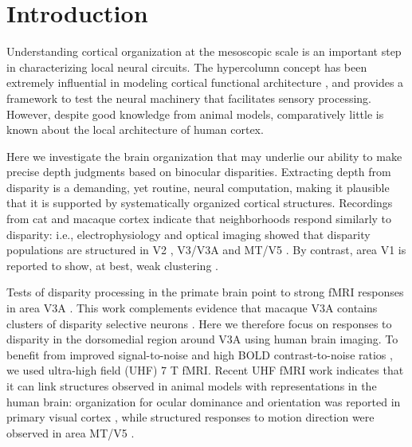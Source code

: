 \section{Introduction}

Understanding cortical organization at the mesoscopic scale is an important step in characterizing local neural circuits. The hypercolumn concept \cite{Hubel:1974sv} has been extremely influential in modeling cortical functional architecture \cite{Tso:2009tg}, and provides a framework to test the neural machinery that facilitates sensory processing. However, despite good knowledge from animal models, comparatively little is known about the local architecture of human cortex. 

Here we investigate the brain organization that may underlie our ability to make precise depth judgments based on binocular disparities. Extracting depth from disparity is a demanding, yet routine, neural computation, making it plausible that it is supported by systematically organized cortical structures. Recordings from cat and macaque cortex indicate that neighborhoods respond similarly to disparity: i.e., electrophysiology and optical imaging showed that disparity populations are structured in V2 \cite{Hubel:1987ly,Roe:1995ys,Tso:2001zr,Chen:2008vn,Kara:2009fk}, V3/V3A \cite{Adams:2001wt,Anzai:2011gb,Yeagle_Lafer-Sousa_Conway_2013} and MT/V5 \cite{DeAngelis:1999fk}. By contrast, area V1 is reported to show, at best, weak clustering \cite{LeVay:1988ve,Prince:2002cr}.

Tests of disparity processing in the primate brain point to strong fMRI responses in area V3A \cite{Backus:2001ly,Tsao:2003lk,Preston:2008dg}. This work complements evidence that macaque V3A contains clusters of disparity selective neurons \cite{Adams:2001wt,Anzai:2011gb,Yeagle_Lafer-Sousa_Conway_2013}. Here we therefore focus on responses to disparity in the dorsomedial region around V3A using human brain imaging. To benefit from improved signal-to-noise and high BOLD contrast-to-noise ratios \cite{Zwaag:2009ss}, we used ultra-high field (UHF) 7 T fMRI. Recent UHF fMRI work indicates that it can link structures observed in animal models with representations in the human brain: organization for ocular dominance and orientation was reported in primary visual cortex \cite{Cheng:2001fk,Yacoub:2008hr}, while structured responses to motion direction were observed in area MT/V5 \cite{Zimmermann:2011kl}. 

